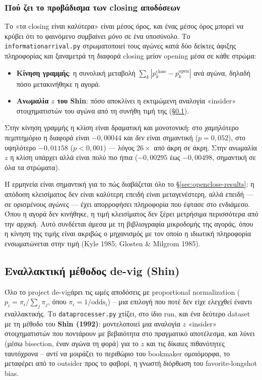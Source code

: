 \documentclass[11pt,a4paper]{article}
\newcommand{\file}[1]{\texttt{#1}}
\renewcommand{\_}{\oldunderscore\allowbreak}
\begin{document}
\subsubsection{Πού ζει το προβάδισμα των closing αποδόσεων}
\label{sec:infoarrival}

Το «τα closing είναι καλύτερα» είναι μέσος όρος, και ένας μέσος όρος μπορεί να κρύβει ότι το
φαινόμενο συμβαίνει μόνο σε ένα υποσύνολο. Το \file{information\_arrival.py} στρωματοποιεί
τους αγώνες κατά δύο δείκτες άφιξης πληροφορίας και ξαναμετρά τη διαφορά closing μείον
opening μέσα σε κάθε στρώμα:

\begin{itemize}
  \item \textbf{Κίνηση γραμμής}: η συνολική μεταβολή $\sum_k |p_k^{\text{close}} -
        p_k^{\text{open}}|$ ανά αγώνα, δηλαδή πόσο μετακινήθηκε η αγορά.
  \item \textbf{Ανωμαλία $z$ του Shin}: πόσο αποκλίνει η εκτιμώμενη αναλογία «insider»
        στοιχηματιστών του αγώνα από τη συνήθη τιμή της (\S\ref{sec:shin}).
\end{itemize}

Στην κίνηση γραμμής η κλίση είναι δραματική και μονοτονική: στο χαμηλότερο πεμπτημόριο η
διαφορά είναι $-0{,}00044$ και \emph{δεν} είναι σημαντική ($p=0{,}052$), στο υψηλότερο
$-0{,}01158$ ($p<0{,}001$) --- λόγος $26\times$ από άκρη σε άκρη. Στην ανωμαλία $z$ η κλίση
υπάρχει αλλά είναι πολύ πιο ήπια ($-0{,}00295$ έως $-0{,}00498$, σημαντική σε όλα τα
στρώματα).

Η ερμηνεία είναι σημαντική για το πώς διαβάζεται όλο το \S\ref{sec:openclose-results}: η
απόδοση κλεισίματος δεν είναι καλύτερη επειδή είναι μεταγενέστερη, αλλά επειδή --- σε
ορισμένους αγώνες --- έχει απορροφήσει πληροφορία που έφτασε στο ενδιάμεσο. Όπου η αγορά δεν
κινήθηκε, η τιμή κλεισίματος δεν ξέρει μετρήσιμα περισσότερα από την αρχική. Αυτό συνδέεται
άμεσα με τη βιβλιογραφία μικροδομής της αγοράς, όπου η κίνηση της τιμής είναι ακριβώς ο
μηχανισμός με τον οποίο η ιδιωτική πληροφορία ενσωματώνεται στην τιμή (Kyle 1985; Glosten
\& Milgrom 1985).

\subsection{Εναλλακτική μέθοδος de-vig (Shin)}
\label{sec:shin}

Όλο το project de-vigάρει τις ωμές αποδόσεις με proportional normalization
($p_i = \pi_i / \sum_j \pi_j$, όπου $\pi_i = 1/\text{odds}_i$) -- μια επιλογή που ποτέ δεν
είχε ελεγχθεί έναντι εναλλακτικής. Το \file{data\_processer.py} χτίζει, στο ίδιο run,
και ένα δεύτερο dataset με τη μέθοδο του \textbf{Shin (1992)}: μοντελοποιεί μια αναλογία
$z$ «insider» στοιχηματιστών που ποντάρουν με βεβαιότητα στο πραγματικό αποτέλεσμα, και
λύνει (μέσω bisection, έναν αγώνα τη φορά) για το $z$ και τις δίκαιες πιθανότητες
ταυτόχρονα -- αντί να μοιράζει το περιθώριο του bookmaker ομοιόμορφα, το μεταφέρει από το
outsider προς το φαβορί, η γνωστή διόρθωση του favorite-longshot bias.
\end{document}
